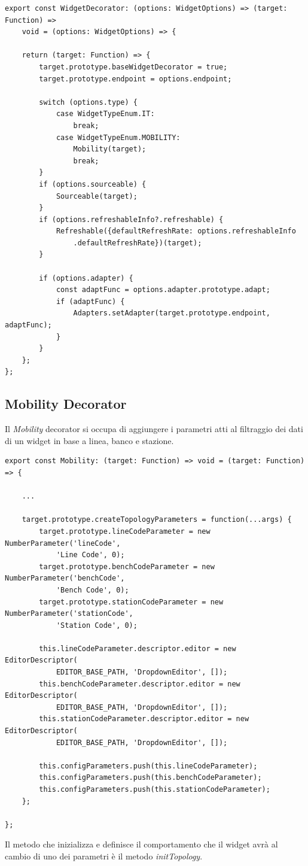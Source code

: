 \begin{lstlisting}[caption={Decorator factory WidgetDecorator}, style=javaScriptCode]
export const WidgetDecorator: (options: WidgetOptions) => (target: Function) => 
    void = (options: WidgetOptions) => {

    return (target: Function) => {
        target.prototype.baseWidgetDecorator = true;
        target.prototype.endpoint = options.endpoint;

        switch (options.type) {
            case WidgetTypeEnum.IT:
                break;
            case WidgetTypeEnum.MOBILITY:
                Mobility(target);
                break;
        }
        if (options.sourceable) {
            Sourceable(target);
        }
        if (options.refreshableInfo?.refreshable) {
            Refreshable({defaultRefreshRate: options.refreshableInfo
                .defaultRefreshRate})(target);
        }

        if (options.adapter) {
            const adaptFunc = options.adapter.prototype.adapt;
            if (adaptFunc) {
                Adapters.setAdapter(target.prototype.endpoint, adaptFunc);
            }
        }
    };
};
\end{lstlisting}
\subsection{Mobility Decorator}
Il \textit{Mobility} decorator si occupa di aggiungere i parametri atti al filtraggio dei dati di un widget in base a linea, banco e stazione.

\begin{lstlisting}[caption={Decorator Mobility, metodo di creazione dei parametri}, style=javaScriptCode]
export const Mobility: (target: Function) => void = (target: Function) => {

    ...

    target.prototype.createTopologyParameters = function(...args) {
        target.prototype.lineCodeParameter = new NumberParameter('lineCode', 
            'Line Code', 0);
        target.prototype.benchCodeParameter = new NumberParameter('benchCode', 
            'Bench Code', 0);
        target.prototype.stationCodeParameter = new NumberParameter('stationCode', 
            'Station Code', 0);

        this.lineCodeParameter.descriptor.editor = new EditorDescriptor(
            EDITOR_BASE_PATH, 'DropdownEditor', []);
        this.benchCodeParameter.descriptor.editor = new EditorDescriptor(
            EDITOR_BASE_PATH, 'DropdownEditor', []);
        this.stationCodeParameter.descriptor.editor = new EditorDescriptor(
            EDITOR_BASE_PATH, 'DropdownEditor', []);

        this.configParameters.push(this.lineCodeParameter);
        this.configParameters.push(this.benchCodeParameter);
        this.configParameters.push(this.stationCodeParameter);
    };

};
\end{lstlisting}
Il metodo che inizializza e definisce il comportamento che il widget avrà al cambio di uno dei parametri è il metodo \textit{initTopology}.

